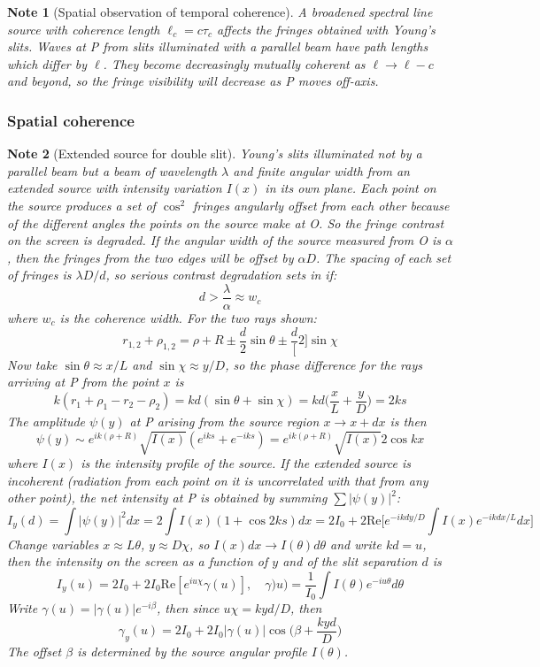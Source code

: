\documentclass[a4paper]{article}
\newtheorem{Note}{Note}[section]
\theoremstyle{new}
\begin{document}
\begin{Note}[Spatial observation of temporal coherence]
A broadened spectral line source with coherence length $\ell_c=c\tau_c$ affects the fringes obtained with Young's slits. Waves at P from slits illuminated with a parallel beam have path lengths which differ by $\ell$. They become decreasingly mutually coherent as $\ell\rightarrow\ell-c$ and beyond, so the fringe visibility will decrease as P moves off-axis.
\end{Note}
\newpage
\subsubsection{Spatial coherence}
\begin{Note}[Extended source for double slit]
Young's slits illuminated not by a parallel beam but a beam of
wavelength $\lambda$ and finite angular width from an extended source with intensity variation $I(x)$ in its own plane. Each point on the source produces a set of $\cos^2$ fringes angularly offset from each other because of the different angles the points on the source make at O. So the fringe contrast on the screen is degraded. If the angular width of the source measured from O is $\alpha$, then the fringes from the two edges will be offset by $\alpha D$. The spacing of each set of fringes is $\lambda D/d$, so serious contrast degradation sets in if:
$$d>\frac{\lambda}{\alpha}\approx w_c$$
where $w_c$ is the coherence width. For the two rays shown:
$$r_{1,2}+\rho_{1,2}=\rho+R\pm\frac{d}{2}\sin\theta\pm\frac{d}[2]\sin\chi$$
Now take $\sin\theta\approx x/L$ and $\sin\chi\approx y/D$, so the phase difference for the rays arriving at P from the point $x$ is 
$$k(r_1+\rho_1-r_2-\rho_2)=kd(\sin\theta+\sin\chi)=kd\bigg(\frac{x}{L}+\frac{y}{D}\bigg)=2ks$$
The amplitude $\psi(y)$ at P arising from the source region $x\rightarrow x+dx$ is then
$$\psi(y)\sim e^{ik(\rho+R)}\sqrt{I(x)}(e^{iks}+e^{-iks})=e^{ik(\rho+R)}\sqrt{I(x)}2\cos kx$$
where $I(x)$ is the intensity profile of the source. If the extended source is incoherent (radiation from each point on it is uncorrelated with that from any other point), the net intensity at P is obtained by summing $\sum|\psi(y)|^2$:
$$I_y(d)=\int|\psi(y)|^2dx=2\int I(x)(1+\cos2 ks)dx=2I_0+2\text{Re}\bigg[e^{-ikdy/D}\int I(x)e^{-ikdx/L}dx\bigg]$$
Change variables $x\approx L\theta$, $y\approx D\chi$, so $I(x)dx\rightarrow I(\theta)d\theta$ and write $kd=u$, then the intensity on the screen as a function of $y$ and of the slit separation $d$ is
$$I_y(u)=2I_0+2I_0\text{Re}[e^{iu\chi}\gamma(u)],\quad\gamma)u)=\frac{1}{I_0}\int I(\theta)e^{-iu\theta}d\theta$$
Write $\gamma(u)=|\gamma(u)|e^{-i\beta}$, then since $u\chi=kyd/D$, then
$$\gamma_y(u)=2I_0+2I_0|\gamma(u)|\cos\bigg(\beta+\frac{kyd}{D}\bigg)$$
The offset $\beta$ is determined by the source angular profile $I(\theta)$.
\end{Note}
\end{document}
